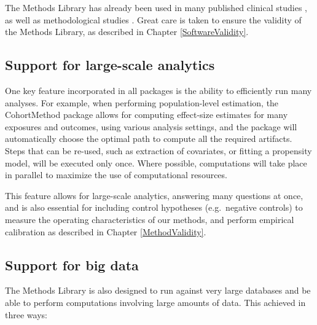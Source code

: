 \documentclass[11pt]{book}
\theoremstyle{definition}
\theoremstyle{definition}
\theoremstyle{definition}
\theoremstyle{remark}
\begin{document}
The Methods Library has already been used in many published clinical studies \citep{boland_2017, duke_2017, ramcharran_2017, weinstein_2017, wang_2017, ryan_2017, ryan_2018, vashisht_2018, yuan_2018, johnston_2019}, as well as methodological studies \citep{schuemie_2014, schuemie_2016, reps2018, tian_2018, schuemie_2018, schuemie_2018b, reps_2019}. Great care is taken to ensure the validity of the Methods Library, as described in Chapter \ref{SoftwareValidity}.

\hypertarget{support-for-large-scale-analytics}{%
\subsection{Support for large-scale analytics}\label{support-for-large-scale-analytics}}

One key feature incorporated in all packages is the ability to efficiently run many analyses. For example, when performing population-level estimation, the CohortMethod package allows for computing effect-size estimates for many exposures and outcomes, using various analysis settings, and the package will automatically choose the optimal path to compute all the required artifacts. Steps that can be re-used, such as extraction of covariates, or fitting a propensity model, will be executed only once. Where possible, computations will take place in parallel to maximize the use of computational resources.

This feature allows for large-scale analytics, answering many questions at once, and is also essential for including control hypotheses (e.g.~negative controls) to measure the operating characteristics of our methods, and perform empirical calibration as described in Chapter \ref{MethodValidity}.

\hypertarget{BigDataSupport}{%
\subsection{Support for big data}\label{BigDataSupport}}

The Methods Library is also designed to run against very large databases and be able to perform computations involving large amounts of data. This achieved in three ways:
\end{document}
